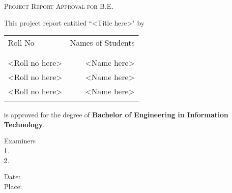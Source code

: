 \newpage
\thispagestyle{empty}

\begin{center}
    \Large \textsc {Project Report Approval for B.E.}\\[0.5cm]
\end{center}

\noindent \normalsize This project report entitled ``<Title here>" by\\
\begin{table}[h]
    \centering
    \begin{tabular}{lr}
        Roll No        & Names of Students \\ \\ \hline
        \\
        <Roll no here> & <Name here>       \\
        <Roll no here> & <Name here>       \\
        <Roll no here> & <Name here>       \\ \\ \hline
    \end{tabular}
\end{table}


\noindent \normalsize is approved for the degree of \textbf{Bachelor of Engineering in Information Technology}.\\[1.0cm]

\begin{flushright}
    Examiners \\[0.5cm]
    1. \underline{\hspace{3cm}}\\[0.5cm]
    2. \underline{\hspace{3cm}}\\[0.5cm]
\end{flushright}

\begin{flushleft}
    Date:\\[0.5cm]
    Place:\\[0.5cm]
\end{flushleft}
